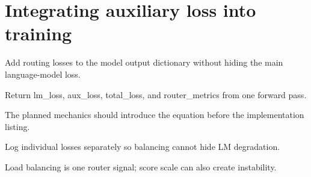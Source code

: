 \section{Integrating auxiliary loss into training}
\label{sec:ch07-integrating-auxiliary-loss-into-training}

Add routing losses to the model output dictionary without hiding the main language-model loss.



Return lm\_loss, aux\_loss, total\_loss, and router\_metrics from one forward pass.



The planned mechanics should introduce the equation before the implementation listing.





\begin{checkpointbox}
Log individual losses separately so balancing cannot hide LM degradation.
\end{checkpointbox}

Load balancing is one router signal; score scale can also create instability.
